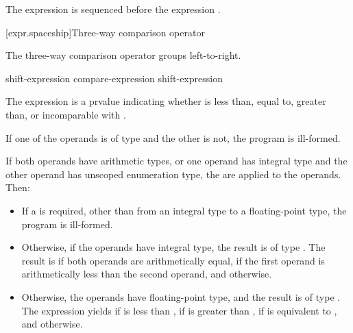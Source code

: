 \pnum
The expression  is sequenced before the expression .

[expr.spaceship]{Three-way comparison operator}
%
%

\pnum
The three-way comparison operator groups left-to-right.

%
%
%

\begin{bnf}
\br
    shift-expression\br
    compare-expression \terminal{<=>} shift-expression
\end{bnf}

\pnum
The expression  is a prvalue indicating whether
 is less than, equal to, greater than, or incomparable with
.

\pnum
If one of the operands is of type 
and the other is not, the program is ill-formed.

\pnum
If both operands have arithmetic types,
or one operand has integral type and
the other operand has unscoped enumeration type,
the  are applied to the operands.
Then:
\begin{itemize}
\item
If a  is required,
other than from an integral type to a floating-point type,
the program is ill-formed.

\item
Otherwise, if the operands have integral type,
the result is of type .
The result is
if both operands are arithmetically equal,
if the first operand is arithmetically
less than the second operand,
and
otherwise.
\item
Otherwise, the operands have floating-point type, and
the result is of type .
The expression  yields
if  is less than ,
if  is greater than ,
if  is equivalent to ,
and
 otherwise.
\end{itemize}

